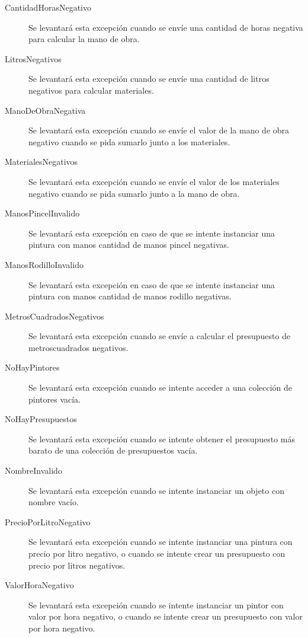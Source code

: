 \documentclass[titlepage,a4paper]{article}
\begin{document}
\begin{description}

\item[CantidadHorasNegativo] Se levantará esta excepción cuando se envíe una cantidad de horas negativa para calcular la mano de obra.

\item[LitrosNegativos] Se levantará esta excepción cuando se envíe una cantidad de litros negativos para calcular materiales.

\item[ManoDeObraNegativa] Se levantará esta excepción cuando se envíe el valor de la mano de obra negativo cuando se pida sumarlo junto a los materiales.

\item[MaterialesNegativos] Se levantará esta excepción cuando se envíe el valor de los materiales negativo cuando se pida sumarlo junto a la mano de obra.

\item[ManosPincelInvalido] Se levantará esta excepción en caso de que se intente instanciar una pintura con manos cantidad de manos pincel negativas.

\item[ManosRodilloInvalido] Se levantará esta excepción en caso de que se intente instanciar una pintura con manos cantidad de manos rodillo negativas.


\item[MetrosCuadradosNegativos] Se levantará esta excepción cuando se envíe a calcular el presupuesto de metroscuadrados negativos.

\item[NoHayPintores] Se levantará esta excepción cuando se intente acceder a una colección de pintores vacía.

\item[NoHayPresupuestos] Se levantará esta excepción cuando se intente obtener el presupuesto más barato de una colección de presupuestos vacía.

\item[NombreInvalido] Se levantará esta excepción cuando se intente instanciar un objeto con nombre vacío.

\item[PrecioPorLitroNegativo] Se levantará esta excepción cuando se intente instanciar una pintura con precio por litro negativo, o cuando se intente crear un presupuesto con precio por litros negativos.

\item[ValorHoraNegativo] Se levantará esta excepción cuando se intente instanciar un pintor con valor por hora negativo, o cuando se intente crear un presupuesto con valor por hora negativo.


\end{description}
\end{document}
